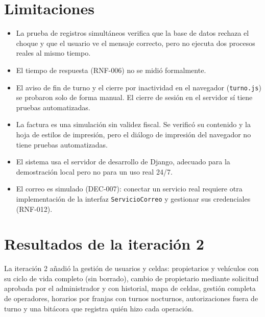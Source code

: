 \section{Limitaciones}
\begin{itemize}
  \item La prueba de registros simultáneos verifica que la base de datos rechaza el choque y que el usuario ve el mensaje correcto, pero no ejecuta dos procesos reales al mismo tiempo.
  \item El tiempo de respuesta (RNF-006) no se midió formalmente.
  \item El aviso de fin de turno y el cierre por inactividad en el navegador (\texttt{turno.js}) se probaron solo de forma manual. El cierre de sesión en el servidor sí tiene pruebas automatizadas.
  \item La factura es una simulación sin validez fiscal. Se verificó su contenido y la hoja de estilos de impresión, pero el diálogo de impresión del navegador no tiene pruebas automatizadas.
  \item El sistema usa el servidor de desarrollo de Django, adecuado para la demostración local pero no para un uso real 24/7.
  \item El correo es simulado (DEC-007): conectar un servicio real requiere otra implementación de la interfaz \texttt{ServicioCorreo} y gestionar sus credenciales (RNF-012).
\end{itemize}

\section{Resultados de la iteración 2}
La iteración 2 añadió la gestión de usuarios y celdas: propietarios y vehículos con su ciclo de vida completo (sin borrado), cambio de propietario mediante solicitud aprobada por el administrador y con historial, mapa de celdas, gestión completa de operadores, horarios por franjas con turnos nocturnos, autorizaciones fuera de turno y una bitácora que registra quién hizo cada operación.

